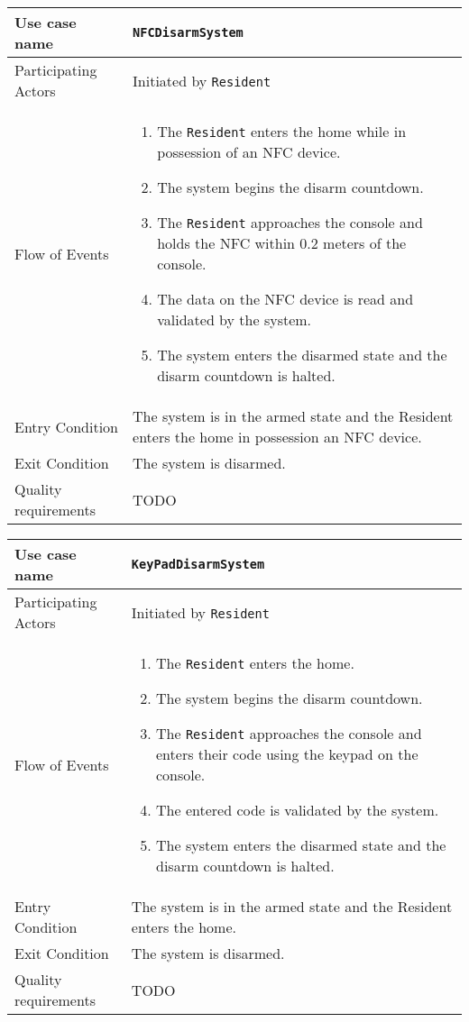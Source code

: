\documentclass{report}
\begin{document}
\begin{tabular}{| l | p{7cm} |}
\hline
Use case name & \texttt{NFCDisarmSystem} \\ \hline
Participating Actors & Initiated by \texttt{Resident} \\ \hline
Flow of Events & 

\begin{enumerate}
 \item The \texttt{Resident} enters the home while in possession of an NFC device.
 \item The system begins the disarm countdown.
 \item The \texttt{Resident} approaches the console and holds the NFC within 0.2 meters of the console.
 \item The data on the NFC device is read and validated by the system.
 \item The system enters the disarmed state and the disarm countdown is halted.
\end{enumerate}

\\ \hline

Entry Condition & The system is in the armed state and the Resident
enters the home in possession an NFC device. \\ \hline

Exit Condition & The system is disarmed. \\ \hline
Quality requirements & TODO \\ \hline

\hline
\end{tabular}

\begin{tabular}{| l | p{7cm} |}
\hline
Use case name & \texttt{KeyPadDisarmSystem} \\ \hline
Participating Actors & Initiated by \texttt{Resident} \\ \hline
Flow of Events & 

\begin{enumerate}
 \item The \texttt{Resident} enters the home.
 \item The system begins the disarm countdown.
 \item The \texttt{Resident} approaches the console and enters their code using the keypad on the console.
 \item The entered code is validated by the system.
 \item The system enters the disarmed state and the disarm countdown is halted.
\end{enumerate}

\\ \hline

Entry Condition & The system is in the armed state and the Resident
enters the home. \\ \hline

Exit Condition & The system is disarmed. \\ \hline
Quality requirements & TODO \\ \hline

\hline
\end{tabular}
\end{document}

